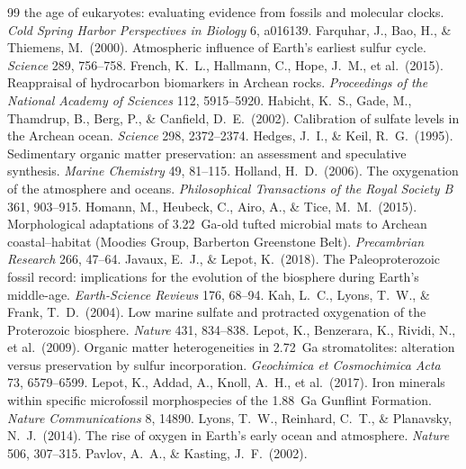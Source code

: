 \documentclass[11pt]{article}
\begin{document}
\begin{thebibliography}{99}
the age of eukaryotes: evaluating evidence from fossils and molecular clocks. \textit{Cold Spring
Harbor Perspectives in Biology} 6, a016139.
 Farquhar, J., Bao, H., \& Thiemens, M.\ (2000).
Atmospheric influence of Earth's earliest sulfur cycle. \textit{Science} 289, 756--758.
 French, K.~L., Hallmann, C., Hope, J.~M., et al.\ (2015).
Reappraisal of hydrocarbon biomarkers in Archean rocks. \textit{Proceedings of the National Academy
of Sciences} 112, 5915--5920.
 Habicht, K.~S., Gade, M., Thamdrup, B., Berg, P., \&
Canfield, D.~E.\ (2002). Calibration of sulfate levels in the Archean ocean. \textit{Science} 298,
2372--2374.
 Hedges, J.~I., \& Keil, R.~G.\ (1995). Sedimentary organic
matter preservation: an assessment and speculative synthesis. \textit{Marine Chemistry} 49, 81--115.
 Holland, H.~D.\ (2006). The oxygenation of the atmosphere and
oceans. \textit{Philosophical Transactions of the Royal Society B} 361, 903--915.
 Homann, M., Heubeck, C., Airo, A., \& Tice, M.~M.\ (2015).
Morphological adaptations of 3.22~Ga-old tufted microbial mats to Archean coastal--habitat
(Moodies Group, Barberton Greenstone Belt). \textit{Precambrian Research} 266, 47--64.
 Javaux, E.~J., \& Lepot, K.\ (2018). The Paleoproterozoic
fossil record: implications for the evolution of the biosphere during Earth's middle-age.
\textit{Earth-Science Reviews} 176, 68--94.
 Kah, L.~C., Lyons, T.~W., \& Frank, T.~D.\ (2004). Low marine
sulfate and protracted oxygenation of the Proterozoic biosphere. \textit{Nature} 431, 834--838.
 Lepot, K., Benzerara, K., Rividi, N., et al.\ (2009). Organic
matter heterogeneities in 2.72~Ga stromatolites: alteration versus preservation by sulfur
incorporation. \textit{Geochimica et Cosmochimica Acta} 73, 6579--6599.
 Lepot, K., Addad, A., Knoll, A.~H., et al.\ (2017). Iron
minerals within specific microfossil morphospecies of the 1.88~Ga Gunflint Formation. \textit{Nature
Communications} 8, 14890.
 Lyons, T.~W., Reinhard, C.~T., \& Planavsky, N.~J.\ (2014).
The rise of oxygen in Earth's early ocean and atmosphere. \textit{Nature} 506, 307--315.
 Pavlov, A.~A., \& Kasting, J.~F.\ (2002).

\end{thebibliography}
\end{document}

